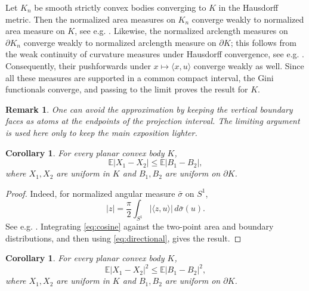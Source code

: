\documentclass[final,12pt]{elsarticle}
\numberwithin{equation}{section}
\newtheorem{cor}[thm]{Corollary}
\newtheorem{rem}[thm]{Remark}
\theoremstyle{remark}
\newcommand{\E}{\mathbb E}
\theoremstyle{definition}
\begin{document}
\par Let $K_n$ be smooth strictly convex bodies converging to $K$ in the
Hausdorff metric. Then the normalized area measures on $K_n$ converge
weakly to normalized area measure on $K$, see e.g.
\cite{Schneider}. Likewise, the normalized arclength measures on
$\partial K_n$ converge weakly to normalized arclength measure on
$\partial K$; this follows from the weak continuity of curvature
measures under Hausdorff convergence, see e.g.
\cite{HugSchneider,Schneider}. Consequently, their pushforwards under
$x\mapsto\langle x,u\rangle$ converge weakly as well. Since all these
measures are supported in a common compact interval, the Gini
functionals converge, and passing to the limit proves the result for
$K$.


\begin{rem}
One can avoid the approximation by keeping the vertical boundary faces as atoms at the endpoints of the projection interval. The limiting argument is used here only to keep the main exposition lighter.
\end{rem}
\begin{cor} \label{corol:conjecture_res}
For every planar convex body $K$,
$$
 \E |X_1-X_2|\le \E |B_1-B_2|,
$$
where $X_1,X_2$ are uniform in $K$ and $B_1,B_2$ are uniform on $\partial K$. 
\end{cor}

\begin{proof}
Indeed, for normalized angular measure $\bar\sigma$ on $S^1$,
\begin{equation}\label{eq:cosine}
 |z|=\frac\pi2\int_{S^1}|\langle z,u\rangle|\,d\bar\sigma(u).
\end{equation}
See e.g. \cite{Schneider}. Integrating \eqref{eq:cosine} against the two-point area and boundary distributions, and then using \eqref{eq:directional}, gives the result.
\end{proof}

\begin{cor}\label{cor:sec_mom_planar}
For every planar convex body $K$,
$$
\mathbb E|X_1-X_2|^2\leq \mathbb E|B_1-B_2|^2,
$$
where $X_1,X_2$ are uniform in $K$ and $B_1,B_2$ are uniform on $\partial K$.
\end{cor}
\end{document}
